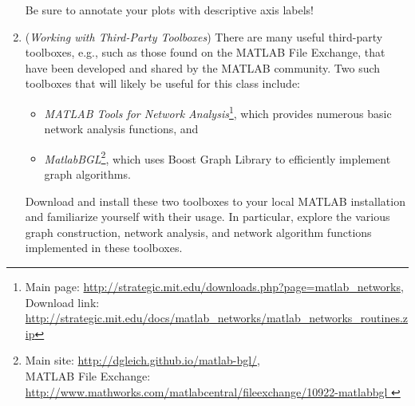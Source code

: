 \documentclass[11pt]{../src/nps-homework}
\begin{document}
\begin{enumerate}
\begin{enumerate}
			
		\end{enumerate}			
	
	
	Be sure to annotate your plots with descriptive axis labels!
	

    \vspace{0.25cm}
  
  
	\item \label{hw:toolboxInstall} (\textit{Working with Third-Party Toolboxes}) There are many useful third-party toolboxes, e.g., such as those found on the MATLAB File Exchange, that have been developed and shared by the MATLAB community. Two such toolboxes that will likely be useful for this class include:
	
		\begin{itemize}
			\item \textit{MATLAB Tools for Network Analysis}\footnote{Main page: \url{http://strategic.mit.edu/downloads.php?page=matlab_networks}, \\Download link: \url{http://strategic.mit.edu/docs/matlab_networks/matlab_networks_routines.zip}}, which provides numerous basic network analysis functions, and
			\item \textit{MatlabBGL}\footnote{Main site: \url{http://dgleich.github.io/matlab-bgl/}, \\MATLAB File Exchange: \url{http://www.mathworks.com/matlabcentral/fileexchange/10922-matlabbgl
}}, which uses Boost Graph Library to efficiently implement graph algorithms.
		\end{itemize}

		Download and install these two toolboxes to your local MATLAB installation and familiarize yourself with their usage.  In particular, explore the various graph construction, network analysis, and network algorithm functions implemented in these toolboxes.		

	


  \end{enumerate}
\end{document}

